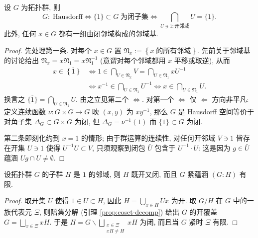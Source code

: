 \begin{lemma}\label{prop:top-group-separation}
	设 $G$ 为拓扑群, 则
	\begin{equation}\label{eqn:top-group-Hausdorff}
		G:\; \text{Hausdorff} \iff \{1\} \subset G\; \text{为闭子集} \iff \bigcap_{U \ni 1: \text{开邻域}} U = \{1\}.
	\end{equation}
	此外, 任何 $x \in G$ 都有一组由闭邻域构成的邻域基.
\end{lemma}
\begin{proof}
	先处理第一条. 对每个 $x \in G$ 置 $\mathfrak{N}_x := \left\{ x \;\text{的所有邻域} \right\}$. 先前关于邻域基的讨论给出 $\mathfrak{N}_x = x\mathfrak{N}_1 = x \mathfrak{N}_1^{-1}$ (意谓对每个邻域都用 $x$ 平移或取逆), 从而
	\begin{equation*}\begin{aligned}
		x \in \overline{\left\{ 1 \right\}} & \iff 1 \in \bigcap_{V \in \mathfrak{N}_x} V = \bigcap_{U \in \mathfrak{N}_1} xU^{-1} \\
		& \iff x^{-1} \in \bigcap_{U \in \mathfrak{N}_1} U^{-1} \iff x \in \bigcap_{U \in \mathfrak{N}_1} U.
	\end{aligned}\end{equation*}
	换言之 $\overline{\{1\}} = \bigcap_{U \in \mathfrak{N}_1} U$. 由之立见第二个 $\iff$. 对第一个 $\iff$ 仅 $\Leftarrow$ 方向非平凡: 定义连续函数 $\nu: G \times G \to G$ 映 $(x,y)$ 为 $xy^{-1}$, 那么 $G$ 是 Hausdorff 空间等价于对角子集 $\Delta_G \subset G \times G$ 为闭, 但 $\Delta_G = \nu^{-1}(1)$ 而 $\{1\} \subset G$ 为闭.

	第二条即刻化约到 $x=1$ 的情形; 由于群运算的连续性, 对任何开邻域 $V \ni 1$ 皆存在开集 $U \ni 1$ 使得 $U^{-1}U \subset V$, 只须观察到闭包 $\bar{U}$ 包含于 $U^{-1} \cdot U$: 这是因为 $g \in \bar{U}$ 蕴涵 $Ug \cap U \neq \emptyset$.
\end{proof}

\begin{lemma}\label{prop:open-closed-subgroup}
	设拓扑群 $G$ 的子群 $H$ 是 $1$ 的邻域, 则 $H$ 既开又闭, 而且 $G$ 紧蕴涵 $(G:H)$ 有限.
\end{lemma}
\begin{proof}
	取开集 $U$ 使得 $1 \in U \subset H$, 因此 $H = \bigcup_{x \in H} Ux$ 为开. 取 $G/H$ 在 $G$ 中的一族代表元 $\Xi$, 则陪集分解 (引理 \ref{prop:coset-decomp}) 给出 $G$ 的开覆盖 $G = \bigsqcup_{x \in \Xi} xH$. 于是 $H = G \smallsetminus \bigsqcup_{\substack{x \in \Xi \\ xH \neq H}} xH$ 为闭, 而且当 $G$ 紧时 $\Xi$ 有限.
\end{proof}


